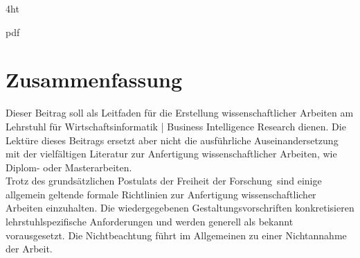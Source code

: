 \documentclass[
               fontsize=12pt, %
               paper=a4,
               oneside,  %
               BCOR=3mm, %
               DIV=13,   %
               headinclude=true,
               footinclude=false,
               bibliography=totoc,
               headsepline,
               parskip=half,
               final,   %
			numbers=noenddot
               ]{scrbook}
\begin{document}
\iftex4ht
\Configure{$}{\PicMath}{\EndPicMath}{} 

         {pdf}  
         {%
         }  
\fi

%
%






\Titelblatt
\litzf
{}
\pagestyle{preamble}
\renewcommand*{\chapterpagestyle}{preamble}

\section*{Zusammenfassung}
Dieser Beitrag soll als Leitfaden für die Erstellung wissenschaftlicher Arbeiten am Lehrstuhl für Wirtschaftsinformatik | Business Intelligence Research dienen. Die Lektüre dieses Beitrags ersetzt aber nicht die ausführliche Auseinandersetzung mit der vielfältigen Literatur zur Anfertigung wissenschaftlicher Arbeiten, wie Diplom- oder Masterarbeiten.\\
Trotz des grundsätzlichen Postulats der \glqq Freiheit der Forschung\grqq \ sind einige allgemein geltende formale Richtlinien zur Anfertigung wissenschaftlicher Arbeiten einzuhalten. Die wiedergegebenen Gestaltungsvorschriften konkretisieren lehrstuhlspezifische Anforderungen und werden generell als bekannt vorausgesetzt. Die Nichtbeachtung führt im Allgemeinen zu einer Nichtannahme der Arbeit.\\
\end{document}
